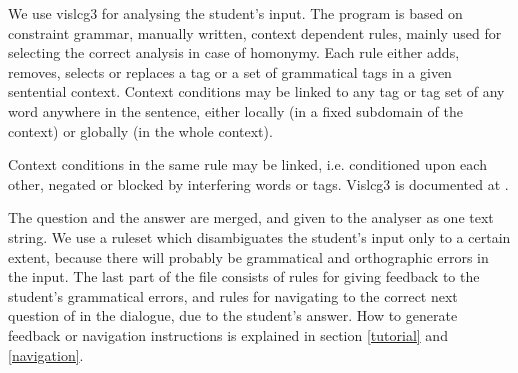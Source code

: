 \documentclass[11pt]{article}
\begin{document}
%
%
%

We use vislcg3 for analysing the student's input. The program is based on constraint grammar, manually written, context dependent rules, mainly used for selecting the correct analysis in case of homonymy. Each rule either adds, removes, selects or replaces a tag or a set of grammatical tags in a given sentential context. Context conditions may be linked to any tag or tag set of any word anywhere in the sentence, either locally (in a fixed subdomain of the context) or globally (in the whole context). 

Context conditions in the same rule may be linked, i.e. conditioned upon each other, negated or blocked by interfering words or tags. Vislcg3 is documented at \cite{Visl:08}.

The question and the answer are merged, and given to the analyser as one text string. We use a ruleset which disambiguates the student's input only to a certain extent, because there will probably be grammatical and orthographic errors in the input. The last part of the file consists of rules for giving feedback to the student's grammatical errors, and rules for navigating to the correct next question of in the dialogue, due to the student's answer. How to generate feedback or navigation instructions is explained in section \ref{tutorial} and \ref{navigation}.
\end{document}

